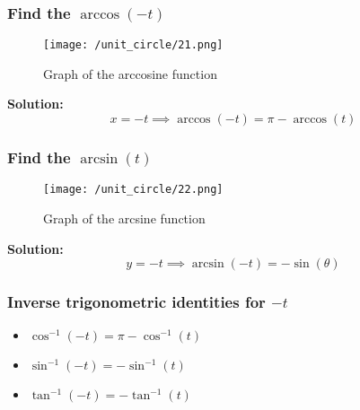 \begin{frame}
    \frametitle{Find the \(\arccos(-t)\)}
    \begin{figure}
        \centering
        \texttt{[image: /unit\_circle/21.png]}
        \caption{Graph of the arccosine function}
    \end{figure}
    \textbf{Solution:} 
    \[ x = -t \implies \arccos(-t) = \pi - \arccos(t) \] 
\end{frame}

\begin{frame}
\frametitle{Find the \(\arcsin(t)\)}
\begin{figure}
    \centering
    \texttt{[image: /unit\_circle/22.png]}
    \caption{Graph of the arcsine function}
\end{figure}
\textbf{Solution:} 
\[ y = -t \implies \arcsin(-t) = -\sin(\theta) \] 
\end{frame}

\begin{frame}
    \frametitle{Inverse trigonometric identities for \(-t\)}
    \begin{itemize}
        \item \( \cos^{-1}(-t) = \pi - \cos^{-1}(t) \)
        \item \( \sin^{-1}(-t) = - \sin^{-1}(t) \)  
        \item \( \tan^{-1}(-t) = -\tan^{-1}(t) \)
    \end{itemize}
\end{frame}